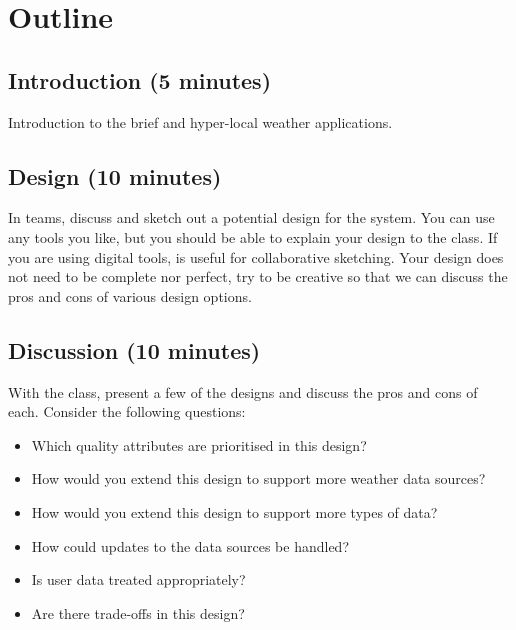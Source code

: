 \documentclass{csse4400}
\begin{document}
\section{Outline}

\subsection*{Introduction (5 minutes)}
Introduction to the brief and hyper-local weather applications.


\subsection*{Design (10 minutes)}
In teams, discuss and sketch out a potential design for the system.
You can use any tools you like, but you should be able to explain your design to the class.
If you are using digital tools,  is useful for collaborative sketching.
Your design does not need to be complete nor perfect,
try to be creative so that we can discuss the pros and cons of various design options.

\subsection*{Discussion (10 minutes)}
With the class, present a few of the designs and discuss the pros and cons of each.
Consider the following questions:
\begin{itemize}
\item Which quality attributes are prioritised in this design?
\item How would you extend this design to support more weather data sources?
\item How would you extend this design to support more types of data?
\item How could updates to the data sources be handled?
\item Is user data treated appropriately?
\item Are there trade-offs in this design?
\end{itemize}
\end{document}
